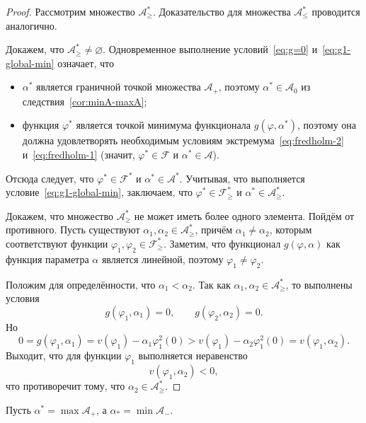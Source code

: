 \documentclass[a4paper,14pt]{article}
\theoremstyle{definition}
\begin{document}
\begin{proof}
  Рассмотрим множество $\mathcal{A}_\geqslant^*$. Доказательство для множества
  $\mathcal{A}_\leqslant^*$ проводится аналогично.

  Докажем, что $\mathcal{A}_\geqslant^* \neq \varnothing$.
  Одновременное выполнение условий~\eqref{eq:g=0} и~\eqref{eq:g1-global-min} означает, что
  \begin{itemize}
    \item $\alpha^*$ является граничной точкой множества $\mathcal{A}_+$, поэтому
          $\alpha^* \in \mathcal{A}_0$ из следствия~\ref{cor:minA-maxA};
    \item функция $\varphi^*$ является точкой минимума функционала $g(\varphi, \alpha^*)$,
          поэтому она должна удовлетворять необходимым условиям
          экстремума~\eqref{eq:fredholm-2} и~\eqref{eq:fredholm-1}
          (значит, $\varphi^* \in \mathcal{F}$ и $\alpha^* \in \mathcal{A}$).
  \end{itemize}
  Отсюда следует, что $\varphi^* \in \mathcal{F}^*$ и $\alpha^* \in \mathcal{A}^*$. Учитывая,
  что выполняется условие~\eqref{eq:g1-global-min}, заключаем, что
  $\varphi^* \in \mathcal{F}_\geqslant^*$ и $\alpha^* \in \mathcal{A}_\geqslant^*$.

  Докажем, что множество $\mathcal{A}_\geqslant^*$ не может иметь более одного элемента.
  Пойдём от противного. Пусть существуют $\alpha_1, \alpha_2 \in \mathcal{A}_\geqslant^*$,
  причём $\alpha_1 \neq \alpha_2$, которым соответствуют функции
  $\varphi_1, \varphi_2 \in \mathcal{F}_\geqslant^*$. Заметим, что функционал
  $g(\varphi, \alpha)$ как функция параметра $\alpha$ является линейной, поэтому
  $\varphi_1 \neq \varphi_2$.

  Положим для определённости, что $\alpha_1 < \alpha_2$. Так как
  $\alpha_1, \alpha_2 \in \mathcal{A}_\geqslant^*$, то выполнены условия
  \begin{equation*}
    g(\varphi_1, \alpha_1) = 0,
    \qquad
    g(\varphi_2, \alpha_2) = 0.
  \end{equation*}
  Но
  \begin{equation*}
    0 = g(\varphi_1, \alpha_1) = v(\varphi_1) - \alpha_1 \varphi_1^2(0)
    > v(\varphi_1) - \alpha_2 \varphi_1^2(0) = v(\varphi_1, \alpha_2).
  \end{equation*}
  Выходит, что для функции $\varphi_1$ выполняется неравенство
  \begin{equation*}
    v(\varphi_1, \alpha_2) < 0,
  \end{equation*}
  что противоречит тому, что $\alpha_2 \in \mathcal{A}_\geqslant^*$.
\end{proof}
Пусть $\alpha^* = \max \mathcal{A}_+$, а $\alpha_* = \min \mathcal{A}_-$.
\end{document}

